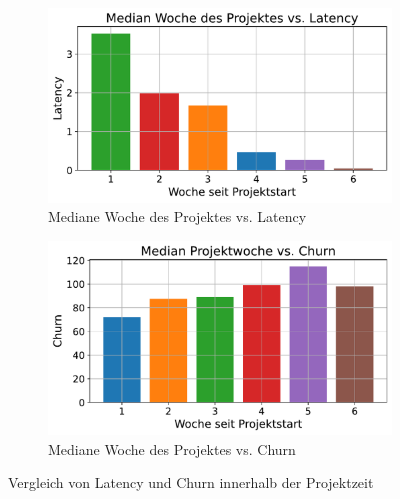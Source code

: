 \begin{figure}[htbp]
    \centering
    \begin{subfigure}[b]{0.48\textwidth}
        \centering
        \includegraphics[width=\textwidth]{Figures/mittelwert-woche-latency.pdf}
        \caption{Mediane Woche des Projektes vs. Latency}
        \label{fig:mittelwert-woche-lateny}
    \end{subfigure}
    \hfill
    \begin{subfigure}[b]{0.48\textwidth}
        \centering
        \includegraphics[width=\textwidth]{Figures/mittelwert-woche-churn.pdf}
        \caption{Mediane Woche des Projektes vs. Churn}
        \label{fig:mittelwert-woche-churn}
    \end{subfigure}
    \caption{Vergleich von Latency und Churn innerhalb der Projektzeit}
    \label{fig:vergleich-latency-churn-projektzeit}
\end{figure}
\newpage

